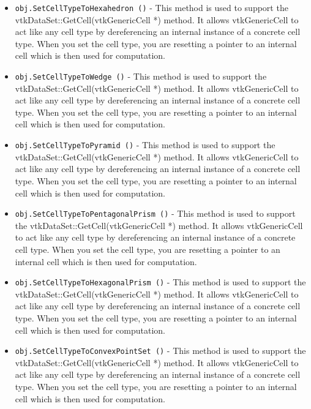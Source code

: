 \begin{itemize}
\item  \verb|obj.SetCellTypeToHexahedron ()| -  This method is used to support the vtkDataSet::GetCell(vtkGenericCell *)
 method. It allows vtkGenericCell to act like any cell type by
 dereferencing an internal instance of a concrete cell type. When
 you set the cell type, you are resetting a pointer to an internal
 cell which is then used for computation.

\item  \verb|obj.SetCellTypeToWedge ()| -  This method is used to support the vtkDataSet::GetCell(vtkGenericCell *)
 method. It allows vtkGenericCell to act like any cell type by
 dereferencing an internal instance of a concrete cell type. When
 you set the cell type, you are resetting a pointer to an internal
 cell which is then used for computation.

\item  \verb|obj.SetCellTypeToPyramid ()| -  This method is used to support the vtkDataSet::GetCell(vtkGenericCell *)
 method. It allows vtkGenericCell to act like any cell type by
 dereferencing an internal instance of a concrete cell type. When
 you set the cell type, you are resetting a pointer to an internal
 cell which is then used for computation.

\item  \verb|obj.SetCellTypeToPentagonalPrism ()| -  This method is used to support the vtkDataSet::GetCell(vtkGenericCell *)
 method. It allows vtkGenericCell to act like any cell type by
 dereferencing an internal instance of a concrete cell type. When
 you set the cell type, you are resetting a pointer to an internal
 cell which is then used for computation.

\item  \verb|obj.SetCellTypeToHexagonalPrism ()| -  This method is used to support the vtkDataSet::GetCell(vtkGenericCell *)
 method. It allows vtkGenericCell to act like any cell type by
 dereferencing an internal instance of a concrete cell type. When
 you set the cell type, you are resetting a pointer to an internal
 cell which is then used for computation.

\item  \verb|obj.SetCellTypeToConvexPointSet ()| -  This method is used to support the vtkDataSet::GetCell(vtkGenericCell *)
 method. It allows vtkGenericCell to act like any cell type by
 dereferencing an internal instance of a concrete cell type. When
 you set the cell type, you are resetting a pointer to an internal
 cell which is then used for computation.


\end{itemize}
